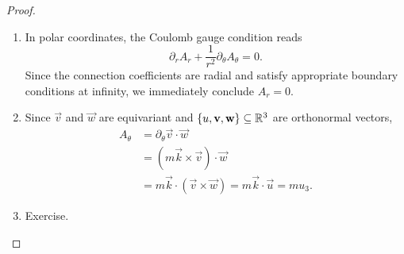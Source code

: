 \begin{proof}
\leavevmode
    \begin{enumerate}
        \item In polar coordinates, the Coulomb gauge condition reads 
            \[
                \partial_r A_r + \frac{1}{r^2} \partial_\theta A_\theta = 0. 
            \]
        Since the connection coefficients are radial and satisfy appropriate boundary conditions at infinity, we immediately conclude $A_r = 0$. 

        \item Since $\vec v$ and $\vec w$ are equivariant and $\{u, \mathbf v, \mathbf w\} \subseteq \mathbb R^3$ are orthonormal vectors, 
            \begin{align*}
                A_\theta    
                    &= \partial_\theta \vec v \cdot \vec w \\\
                    &= (m\vec k \times \vec v) \cdot \vec w \\
                    &= m \vec k \cdot (\vec v \times \vec w) = m\vec k \cdot \vec u = m u_3. 
            \end{align*}
        \item Exercise. 
    \end{enumerate}
\end{proof}

